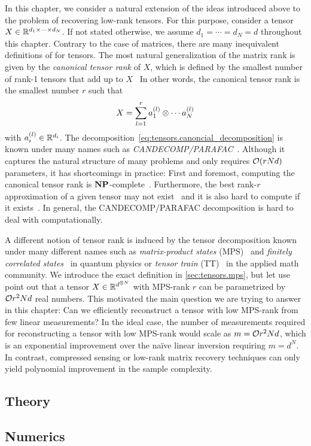 In this chapter, we consider a natural extension of the ideas introduced above to the problem of recovering low-rank tensors.
For this purpose, consider a tensor $X \in {\mathbb{R}}^{d_1 \times \cdots \times d_N}$.
If not stated otherwise, we assume $d_1 = \cdots = d_N = d$ throughout this chapter.
Contrary to the case of matrices, there are many inequivalent definitions of  for tensors.
The most natural generalization of the matrix rank is given by the \emph{canonical tensor rank} of $X$, which is defined by the smallest number of rank-1 tensors that add up to $X$~\cite{Kolda_2009_Tensor}
In other words, the canonical tensor rank is the smallest number $r$ such that
\[
  X = \sum_{l=1}^r a^{(l)}_1 \otimes \cdots a^{(l)}_N
  \label{eq:tensors.canonical_decomposition}
\]
with $a^{(l)}_i \in {\mathbb{R}}^{d_i}$.
The decomposition~\eqref{eq:tensors.canoncial_decomposition} is known under many names such as \emph{CANDECOMP/PARAFAC}~\cite{Kolda_2009_Tensor}.
Although it captures the natural structure of many problems and only requires ${\mathcal{O}}(r N d)$ parameters, it has shortcomings in practice:
First and foremost, computing the canonical tensor rank is $\mathbf{NP}$-complete~\cite{Hastad_1990_Tensor}.
Furthermore, the best rank-$r$ approximation of a given tensor may not exist~\cite{Kolda_2009_Tensor} and it is also hard to compute if it exists~\cite{Hillar_2013_Most}.
In general, the CANDECOMP/PARAFAC decomposition is hard to deal with computationally.

A different notion of tensor rank is induced by the tensor decomposition known under many different names such as \emph{matrix-product states} (MPS)~\cite{Garcia_2006_Matrix,Verstraete_2008_Matrix,Orus_2014_Practical} and \emph{finitely correlated states}~\cite{Fannes_1992_Finitely} in quantum physics or \emph{tensor train} (TT)~\cite{Oseledets_2011_TensorTrain} in the applied math community.
We introduce the exact definition in \cref{sec:tensors.mps}, but let use point out that a tensor $X \in {\mathbb{R}}^{d^{\otimes N}}$ with MPS-rank $r$ can be parametrized by ${\mathcal{O}}{r^2 N d}$ real numbers.
This motivated the main question we are trying to answer in this chapter:
Can we efficiently reconstruct a tensor with low MPS-rank from few linear measurements?
In the ideal case, the number of measurements required for reconstructing a tensor with low MPS-rank would scale as $m = {\mathcal{O}}{r^2 N d}$, which is an exponential improvement over the naïve linear inversion requiring $m = d^N$.
In contrast, compressed sensing or low-rank matrix recovery techniques can only yield polynomial improvement in the sample complexity.


%

\subsection{Theory}%
\subsection{Numerics}%

